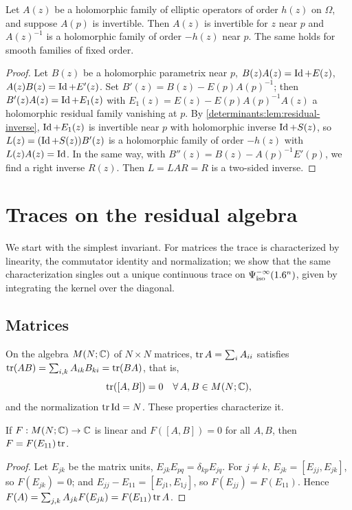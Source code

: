 \begin{lemma}\label{determinants:lem:local-inversion}
  Let $A(z)$ be a holomorphic family of elliptic operators of order $h(z)$ on
  $\Omega$, and suppose $A(p)$ is invertible. Then $A(z)$ is invertible for $z$
  near $p$ and $A(z)^{-1}$ is a holomorphic family of order $-h(z)$ near $p$.
  The same holds for smooth families of fixed order.
\end{lemma}
\begin{proof}
  Let $B(z)$ be a holomorphic parametrix near $p$,
  $B(z)A(z)=\operatorname{Id}+E(z)$, $A(z)B(z)=\operatorname{Id}+E'(z)$. Set
  $B'(z)=B(z)-E(p)A(p)^{-1}$; then $B'(z)A(z)=\operatorname{Id}+E_1(z)$ with
  $E_1(z)=E(z)-E(p)A(p)^{-1}A(z)$ a holomorphic residual family vanishing at
  $p$. By \cref{determinants:lem:residual-inverse}, $\operatorname{Id}+E_1(z)$ is invertible
  near $p$ with holomorphic inverse $\operatorname{Id}+S(z)$, so $L(z)=(\operatorname{Id}+S(z))B'(z)$ is a
  holomorphic family of order $-h(z)$ with $L(z)A(z)=\operatorname{Id}$. In the same way,
  with $B''(z)=B(z)-A(p)^{-1}E'(p)$, we find a right inverse $R(z)$. Then
  $L=LAR=R$ is a two-sided inverse.
\end{proof}

\section{Traces on the residual algebra}\label{determinants:sec:traces}

We start with the simplest invariant. For matrices the trace is
characterized by linearity, the commutator identity and normalization; we
show that the same characterization singles out a unique continuous trace on
$\Psi^{-\infty}_{\mathrm{iso}}(1.6^n)$, given by integrating the kernel over the diagonal.

\subsection*{Matrices}
On the algebra $M(N;\mathbb{C})$ of $N\times N$ matrices, $\operatorname{tr} A=\sum_iA_{ii}$
satisfies $\operatorname{tr}(AB)=\sum_{i,k}A_{ik}B_{ki}=\operatorname{tr}(BA)$, that is,
\begin{equation*}
  \operatorname{tr}([A,B])=0\quad\forall\,A,B\in M(N;\mathbb{C}),
\end{equation*}
and the normalization $\operatorname{tr}\operatorname{Id}=N$. These properties characterize it.

\begin{lemma}\label{determinants:lem:matrix-trace}
  If $F:M(N;\mathbb{C})\to\mathbb{C}$ is linear and $F([A,B])=0$ for all $A,B$, then
  $F=F(E_{11})\operatorname{tr}$.
\end{lemma}
\begin{proof}
  Let $E_{jk}$ be the matrix units, $E_{jk}E_{pq}=\delta_{kp}E_{jq}$. For
  $j\ne k$, $E_{jk}=[E_{jj},E_{jk}]$, so $F(E_{jk})=0$; and
  $E_{jj}-E_{11}=[E_{j1},E_{1j}]$, so $F(E_{jj})=F(E_{11})$. Hence
  $F(A)=\sum_{j,k}A_{jk}F(E_{jk})=F(E_{11})\operatorname{tr} A$.
\end{proof}


